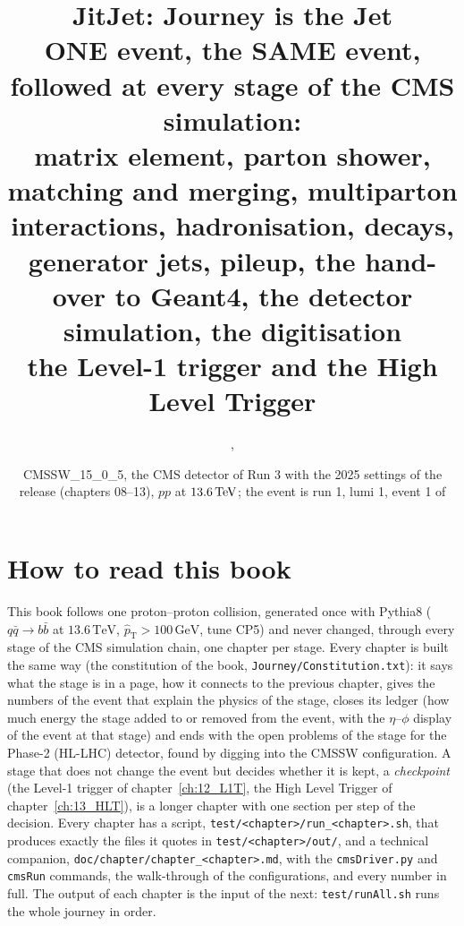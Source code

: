 \documentclass[11pt,a4paper,oneside]{report}
\title{\textbf{JitJet: Journey is the Jet}\\[6pt]
  \large ONE \bbbar{} event, the SAME event, followed at every stage of the CMS simulation:\\
  matrix element, parton shower, matching and merging, multiparton interactions, hadronisation, decays,\\
  generator jets, pileup, the hand-over to Geant4, the detector simulation, the digitisation\\
  the Level-1 trigger and the High Level Trigger}
\author{\code{JitJetSW/Journey}, \code{doc/JitJetSW.tex}}
\date{CMSSW\_15\_0\_5, the CMS detector of Run 3 with the 2025 settings of the release (chapters 08--13),
  $pp$ at $13.6\TeV$; the event is run 1, lumi 1, event 1 of
  \code{test/06\_Decay/out/step1\_GEN\_06\_Decay.root}}
\newcommand{\code}[1]{\texttt{#1}}
\newcommand{\bbbar}{\ensuremath{b\bar{b}}}
\newcommand{\qqbar}{\ensuremath{q\bar{q}}}
\newcommand{\GeV}{\,\mathrm{GeV}}
\newcommand{\TeV}{\,\mathrm{TeV}}
\newcommand{\ptHat}{\ensuremath{\hat{p}_{\mathrm{T}}}}
\begin{document}
\maketitle

\chapter*{How to read this book}
This book follows one proton--proton collision, generated once with Pythia8 ($\qqbar\to\bbbar$ at
$13.6\TeV$, $\ptHat>100\GeV$, tune CP5) and never changed, through every stage of the CMS simulation chain,
one chapter per stage. Every chapter is built the same way (the constitution of the book,
\code{Journey/Constitution.txt}): it says what the stage is in a page, how it connects to the previous chapter,
gives the numbers of the event that explain the physics of the stage, closes its ledger (how much energy the
stage added to or removed from the event, with the $\eta$--$\phi$ display of the event at that stage) and ends
with the open problems of the stage for the Phase-2 (HL-LHC) detector, found by digging into the CMSSW
configuration. A stage that does not change the event but decides whether it is kept, a \emph{checkpoint} (the
Level-1 trigger of chapter~\ref{ch:12_L1T}, the High Level Trigger of chapter~\ref{ch:13_HLT}), is a longer chapter with one section per step of the decision. Every chapter has a script, \code{test/<chapter>/run\_<chapter>.sh}, that produces exactly the files
it quotes in \code{test/<chapter>/out/}, and a technical companion, \code{doc/chapter/chapter\_<chapter>.md}, with the
\code{cmsDriver.py} and \code{cmsRun} commands, the walk-through of the configurations, and every number in full.
The output of each chapter is the input of the next: \code{test/runAll.sh} runs the whole journey in order.
\end{document}
